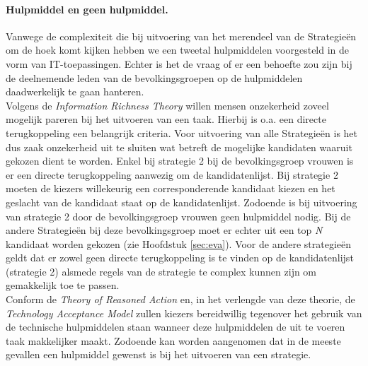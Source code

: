\paragraph{Hulpmiddel en geen hulpmiddel.} 
Vanwege de complexiteit die bij uitvoering van het merendeel van de Strategie\"{e}n om de hoek komt kijken hebben we een tweetal hulpmiddelen voorgesteld in de vorm van IT-toepassingen. Echter is het de vraag of er een behoefte zou zijn bij de deelnemende leden van de bevolkingsgroepen op de hulpmiddelen daadwerkelijk te gaan hanteren. \\
\indent Volgens de \textit{Information Richness Theory} \citep{daft1983information} willen mensen onzekerheid zoveel mogelijk pareren bij het uitvoeren van een taak. Hierbij is o.a. een directe terugkoppeling een belangrijk criteria. Voor uitvoering van alle Strategie\"{e}n is het dus zaak onzekerheid uit te sluiten wat betreft de mogelijke kandidaten waaruit gekozen dient te worden. Enkel bij strategie 2 bij de bevolkingsgroep vrouwen is er een directe terugkoppeling aanwezig om de kandidatenlijst. Bij strategie 2 moeten de kiezers willekeurig een corresponderende kandidaat kiezen en het geslacht van de kandidaat staat op de kandidatenlijst. Zodoende is bij uitvoering van strategie 2 door de bevolkingsgroep vrouwen geen hulpmiddel nodig. Bij de andere Strategie\"{e}n bij deze bevolkingsgroep moet er echter uit een top \textit{N} kandidaat worden gekozen (zie Hoofdstuk \ref{sec:eva}). Voor de andere strategie\"{e}n geldt dat er zowel geen directe terugkoppeling is te vinden op de kandidatenlijst (strategie 2) alsmede regels van de strategie te complex kunnen zijn om gemakkelijk toe te passen. \\
\indent Conform de \textit{Theory of Reasoned Action} \citep{fishbein1977belief,ajzen1991theory} en, in het verlengde van deze theorie, de \textit{Technology Acceptance Model} \citep{davis1989perceived,davis1989user, venkatesh2000determinants} zullen kiezers bereidwillig tegenover het gebruik van de technische hulpmiddelen staan wanneer deze hulpmiddelen de uit te voeren taak makkelijker maakt. Zodoende kan worden aangenomen dat in de meeste gevallen een hulpmiddel gewenst is bij het uitvoeren van een strategie. 

